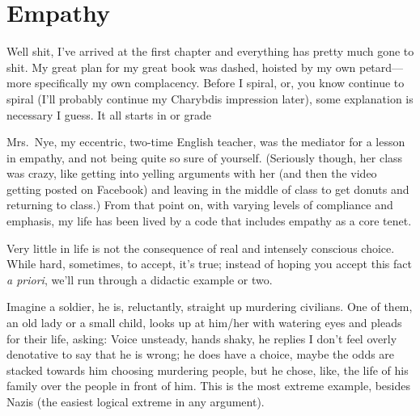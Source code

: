 \documentclass[../butidigress.tex]{subfiles}
\begin{document}
\chapter{Empathy}\label{chap:empathy}
\newpage

Well shit, I've arrived at the first chapter and everything has pretty much gone to shit.
My great plan for my great book was dashed, hoisted by my own petard---more specifically my own complacency.
Before I spiral, or, you know continue to spiral (I'll probably continue my Charybdis impression later), some explanation is necessary I guess.
It all starts in  or  grade\lips{}

Mrs.~Nye, my eccentric, two-time English teacher, was the mediator for a lesson in empathy, and not being quite so sure of yourself.
(Seriously though, her class was crazy, like getting into yelling arguments with her (and then the video getting posted on Facebook) and leaving in the middle of class to get donuts and returning to class.)
From that point on, with varying levels of compliance and emphasis, my life has been lived by a code that includes empathy as a core tenet.

Very little in life is not the consequence of real and intensely conscious choice.
While hard, sometimes, to accept, it's true; instead of hoping you accept this fact \textit{a priori}, we'll run through a didactic example or two.

Imagine a soldier, he is, reluctantly, straight up murdering civilians.
One of them, an old lady or a small child, looks up at him/her with watering eyes and pleads for their life, asking: 
Voice unsteady, hands shaky, he replies 
I don't feel overly denotative to say that he is wrong; he does have a choice, maybe the odds are stacked towards him choosing murdering people, but he chose, like, the life of his family over the people in front of him.
This is the most extreme example, besides Nazis (the easiest logical extreme in any argument).
\end{document}
